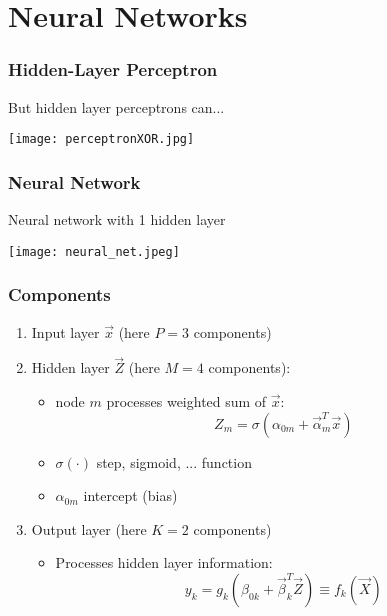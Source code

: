 \documentclass[mathserif]{beamer}
\begin{document}
\section{Neural Networks}

\begin{frame}
  \frametitle{Hidden-Layer Perceptron}
  But hidden layer perceptrons can...
  \begin{center}
    \texttt{[image: perceptronXOR.jpg]}
  \end{center}
\end{frame}

\begin{frame}
  \frametitle{Neural Network}
  Neural network with 1 hidden layer
  \begin{center}
    \texttt{[image: neural\_net.jpeg]}
  \end{center}
\end{frame}

\begin{frame}
  \frametitle{Components}
  \begin{enumerate}
  \item Input layer $\vec{x}$ (here $P = 3$ components)
  \item Hidden layer $\vec{Z}$ (here $M = 4$ components):
    \begin{itemize}
    \item node $m$ processes weighted sum of $\vec{x}$:
      \begin{equation*}
        Z_{m} = \sigma(\alpha_{0m} + \vec{\alpha}_{m}^{T} \vec{x})
      \end{equation*}
    \item $\sigma(\cdot)$ step, sigmoid, ... function
    \item $\alpha_{0m}$ intercept (bias)
    \end{itemize}
  \item Output layer (here $K = 2$ components)
    \begin{itemize}
    \item Processes hidden layer information:
      \begin{equation*}
        y_{k} = g_{k}(\beta_{0k} + \vec{\beta}_{k}^{T} \vec{Z}) 
        \equiv f_{k}(\vec{X})
      \end{equation*}
    \end{itemize}
  \end{enumerate}
\end{frame}
\end{document}
